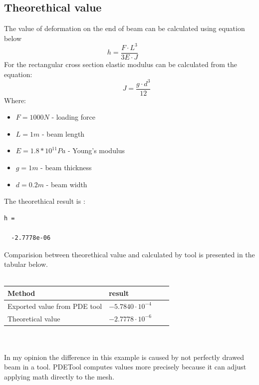 \documentclass[a4paper,12pt]{article}
\begin{document}
\subsection{Theorethical value}
The value of deformation on the end of beam can be calculated using equation below
\begin{equation}
   h = \frac{F \cdot L^3}{3E \cdot J} \qquad
\end{equation}
For the rectangular cross section elastic modulus can be calculated from the equation:
\begin{equation}
\qquad J = \frac{g \cdot d^3}{12}
\end{equation}
Where:
\begin{itemize}
     \item $F = 1000 N$ - loading force
     \item $L = 1 m$ - beam length
     \item $E = 1.8 * 10^{11} Pa$ - Young's modulus
     \item $g = 1m$ - beam thickness
     \item $d = 0.2m$ - beam width
\end{itemize}
The theorethical result is :
\begin{lstlisting}
h =

  -2.7778e-06
\end{lstlisting}
Comparision between theorethical value and calculated by tool is presented in the tabular below.\\\\
\begin{tabular}{|l|l|l|l|}
\hline 
Method  & result \\ \hline 
Exported value from PDE tool& $-5.7840 \cdot 10^{-4}$  \\ \hline 
Theoretical value & $-2.7778 \cdot 10^{-6}$  \\ \hline
\end{tabular}\\\\
In my opinion the difference in this example is caused by not perfectly drawed beam in a tool. PDETool computes values more precisely because it can adjust applying math directly to the mesh.
\end{document}
